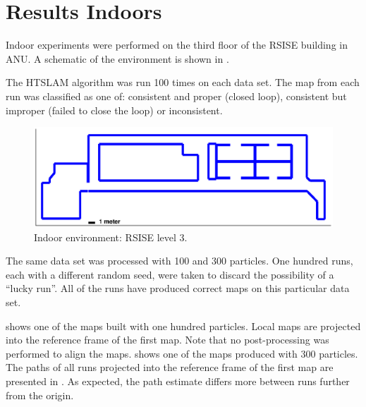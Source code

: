 \section {Results Indoors}

Indoor experiments were performed on the third floor of the RSISE
building in ANU. A schematic of the environment is shown in
.

The HTSLAM algorithm was run 100 times on each data set. The map from
each run was classified as one of: consistent and proper (closed
loop), consistent but improper (failed to close the loop) or
inconsistent.

 
\begin{figure}[htbp]
  \centering
  \includegraphics[width=13cm]{Pics/rsise_level3_map}
  \caption{Indoor environment: RSISE level 3.}
  \label{fig:rsise_level3_map}
\end{figure}

The same data set was processed with 100 and 300 particles. One
hundred runs, each with a different random seed, were taken to discard
the possibility of a ``lucky run''. All of the runs have produced
correct maps on this particular data set.

 shows one of the maps built with one
hundred particles. Local maps are projected into the reference frame
of the first map. Note that no post-processing was performed to align
the maps.  shows one of the maps
produced with 300 particles. The paths of all runs projected into the
reference frame of the first map are presented in
. As expected, the path estimate differs
more between runs further from the origin.


